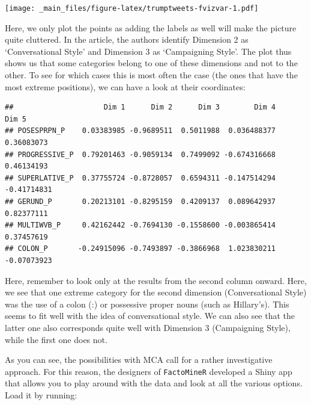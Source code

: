\documentclass[
]{book}
\newenvironment{Shaded}{\begin{snugshade}}{\end{snugshade}}
\newcommand{\AttributeTok}[1]{\textcolor[rgb]{0.13,0.29,0.53}{#1}}
\newcommand{\FunctionTok}[1]{\textcolor[rgb]{0.13,0.29,0.53}{\textbf{#1}}}
\newcommand{\NormalTok}[1]{#1}
\newcommand{\OtherTok}[1]{\textcolor[rgb]{0.56,0.35,0.01}{#1}}
\newcommand{\SpecialCharTok}[1]{\textcolor[rgb]{0.81,0.36,0.00}{\textbf{#1}}}
\newcommand{\StringTok}[1]{\textcolor[rgb]{0.31,0.60,0.02}{#1}}
\begin{document}
\texttt{[image: \_main\_files/figure-latex/trumptweets-fvizvar-1.pdf]}

Here, we only plot the points as adding the labels as well will make the picture quite cluttered. In the article, the authors identify Dimension 2 as `Conversational Style' and Dimension 3 as `Campaigning Style'. The plot thus shows us that some categories belong to one of these dimensions and not to the other. To see for which cases this is most often the case (the ones that have the most extreme positions), we can have a look at their coordinates:

\begin{Shaded}
\end{Shaded}

\begin{verbatim}
##                     Dim 1      Dim 2      Dim 3        Dim 4       Dim 5
## POSESPRPN_P    0.03383985 -0.9689511  0.5011988  0.036488377  0.36083073
## PROGRESSIVE_P  0.79201463 -0.9059134  0.7499092 -0.674316668  0.46134193
## SUPERLATIVE_P  0.37755724 -0.8728057  0.6594311 -0.147514294 -0.41714831
## GERUND_P       0.20213101 -0.8295159  0.4209137  0.089642937  0.82377111
## MULTIWVB_P     0.42162442 -0.7694130 -0.1558600 -0.003865414  0.37457619
## COLON_P       -0.24915096 -0.7493897 -0.3866968  1.023830211 -0.07073923
\end{verbatim}

Here, remember to look only at the results from the second column onward. Here, we see that one extreme category for the second dimension (Conversational Style) was the use of a colon (:) or possessive proper nouns (such as Hillary's). This seems to fit well with the idea of conversational style. We can also see that the latter one also corresponds quite well with Dimension 3 (Campaigning Style), while the first one does not.

As you can see, the possibilities with MCA call for a rather investigative approach. For this reason, the designers of \texttt{FactoMineR} developed a Shiny app that allows you to play around with the data and look at all the various options. Load it by running:
\end{document}

